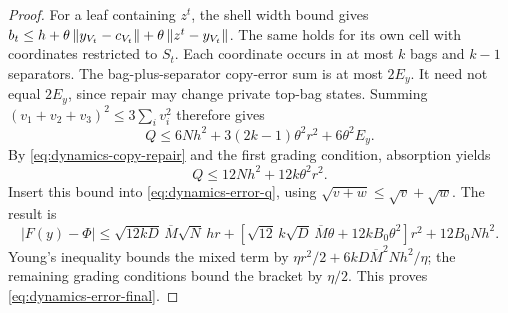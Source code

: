 \begin{proof}
For a leaf containing $z^t$, the shell width bound gives
$b_t\le h+\theta\left\lVert y_{V_t}-c_{V_t}\right\rVert
                +\theta\left\lVert z^t-y_{V_t}\right\rVert$.
The same holds for its own cell with coordinates restricted to $S_t$.
Each coordinate occurs in at most $k$ bags and $k-1$ separators.
The bag-plus-separator copy-error sum is at most $2E_y$.
It need not equal $2E_y$, since repair may change private top-bag states.
Summing $(v_1+v_2+v_3)^2\le3\sum_i v_i^2$ therefore gives
\[
 Q\le6Nh^2+3(2k-1)\theta^2r^2+6\theta^2E_y.
\]
By \eqref{eq:dynamics-copy-repair} and the first grading condition,
absorption yields
\begin{equation}\label{eq:dynamics-aggregate-grading}
 Q\le12Nh^2+12k\theta^2r^2.
\end{equation}
Insert this bound into \eqref{eq:dynamics-error-q}, using
$\sqrt{v+w}\le\sqrt v+\sqrt w$. The result is
\[
 |F(y)-\Phi|\le\sqrt{12kD}\,\overline M\sqrt N\,hr
 +[\sqrt{12}\,k\sqrt D\,\overline M\theta+12kB_0\theta^2]r^2
 +12B_0Nh^2.
\]
Young's inequality bounds the mixed term by
$\eta r^2/2+6kD\overline M^2Nh^2/\eta$; the remaining grading
conditions bound the bracket by $\eta/2$. This proves
\eqref{eq:dynamics-error-final}.
\end{proof}

